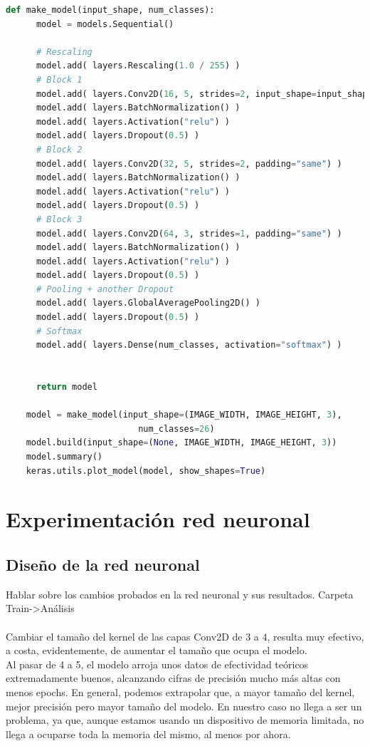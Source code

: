 \begin{appendices}
\begin{lstlisting}[language=python, title=Fragmento de \textit{Train.ipynb}]
    def make_model(input_shape, num_classes):
      model = models.Sequential()
    
      # Rescaling
      model.add( layers.Rescaling(1.0 / 255) )
      # Block 1
      model.add( layers.Conv2D(16, 5, strides=2, input_shape=input_shape) )
      model.add( layers.BatchNormalization() )
      model.add( layers.Activation("relu") )
      model.add( layers.Dropout(0.5) )
      # Block 2
      model.add( layers.Conv2D(32, 5, strides=2, padding="same") )
      model.add( layers.BatchNormalization() )
      model.add( layers.Activation("relu") )
      model.add( layers.Dropout(0.5) )
      # Block 3
      model.add( layers.Conv2D(64, 3, strides=1, padding="same") )
      model.add( layers.BatchNormalization() )
      model.add( layers.Activation("relu") )
      model.add( layers.Dropout(0.5) )
      # Pooling + another Dropout
      model.add( layers.GlobalAveragePooling2D() )
      model.add( layers.Dropout(0.5) )
      # Softmax
      model.add( layers.Dense(num_classes, activation="softmax") )
    
    
      return model
    
    model = make_model(input_shape=(IMAGE_WIDTH, IMAGE_HEIGHT, 3),
                          num_classes=26)
    model.build(input_shape=(None, IMAGE_WIDTH, IMAGE_HEIGHT, 3))
    model.summary()
    keras.utils.plot_model(model, show_shapes=True)
\end{lstlisting}

\section{Experimentación red neuronal}
\subsection{Diseño de la red neuronal\label{expRN}}
{\color{red} Hablar sobre los cambios probados en la red neuronal y
sus resultados. Carpeta Train->Análisis\\\\
Cambiar el tamaño del kernel de las capas Conv2D de 3 a 4, resulta muy efectivo,
a costa, evidentemente, de aumentar el tamaño que ocupa el modelo.\\
Al pasar de 4 a 5, el modelo arroja unos datos de efectividad teóricos extremadamente
buenos, alcanzando cifras de precisión mucho más altas con menos epochs.
En general, podemos extrapolar que, a mayor tamaño del kernel, mejor precisión pero
mayor tamaño del modelo. En nuestro caso no llega a ser un problema, ya que, aunque
estamos usando un dispositivo de memoria limitada, no llega a ocuparse toda la memoria
del mismo, al menos por ahora.}


\end{appendices}
